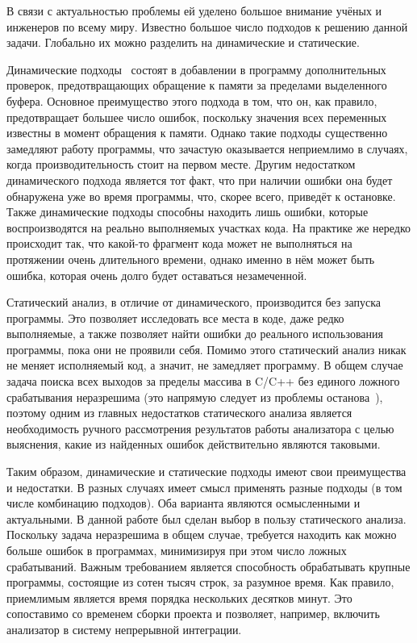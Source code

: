 В связи с актуальностью проблемы ей уделено большое внимание учёных и
инженеров по всему миру. Известно большое число подходов к решению
данной задачи. Глобально их можно разделить на динамические и
статические.

Динамические подходы~\cite{cowan1998stackguard, ruwase2004practical,
  hastings1991purify} состоят в добавлении в программу дополнительных
проверок, предотвращающих обращение к памяти за пределами выделенного
буфера. Основное преимущество этого подхода в том, что он, как
правило, предотвращает большее число ошибок, поскольку значения всех
переменных известны в момент обращения к памяти. Однако такие подходы
существенно замедляют работу программы, что зачастую оказывается
неприемлимо в случаях, когда производительность стоит на первом
месте. Другим недостатком динамического подхода является тот факт, что
при наличии ошибки она будет обнаружена уже во время программы, что,
скорее всего, приведёт к остановке. Также динамические подходы
способны находить лишь ошибки, которые воспроизводятся на реально
выполняемых участках кода. На практике же нередко происходит так, что
какой-то фрагмент кода может не выполняться на протяжении очень
длительного времени, однако именно в нём может быть ошибка, которая
очень долго будет оставаться незамеченной.

Статический анализ, в отличие от динамического, производится без
запуска программы. Это позволяет исследовать все места в коде, даже
редко выполняемые, а также позволяет найти ошибки до реального
использования программы, пока они не проявили себя. Помимо этого
статический анализ никак не меняет исполняемый код, а значит, не
замедляет программу. В общем случае задача поиска всех выходов за
пределы массива в C/C++ без единого ложного срабатывания неразрешима
(это напрямую следует из проблемы
останова~\cite{turing1937computable}), поэтому одним из главных
недостатков статического анализа является необходимость ручного
рассмотрения результатов работы анализатора с целью выяснения, какие
из найденных ошибок действительно являются таковыми.

Таким образом, динамические и статические подходы имеют свои
преимущества и недостатки. В разных случаях имеет смысл применять
разные подходы (в том числе комбинацию подходов). Оба варианта
являются осмысленными и актуальными. В данной работе был сделан выбор
в пользу статического анализа. Поскольку задача неразрешима в общем
случае, требуется находить как можно больше ошибок в программах,
минимизируя при этом число ложных срабатываний. Важным требованием
является способность обрабатывать крупные программы, состоящие из
сотен тысяч строк, за разумное время. Как правило, приемлимым является
время порядка нескольких десятков минут. Это сопоставимо со временем
сборки проекта и позволяет, например, включить анализатор в систему
непрерывной интеграции.


